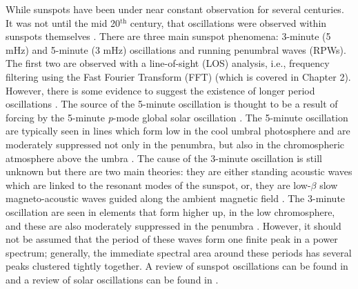     While sunspots have been under near constant observation for several centuries.
    It was not until the mid 20$^{\mathrm{th}}$ century, that oscillations were observed within sunspots themselves \citep{OASO}.
    There are three main sunspot phenomena: 3-minute (5 mHz) and 5-minute (3 mHz) oscillations and running penumbral waves (RPWs).
    The first two are observed with a line-of-sight (LOS) analysis, i.e., frequency filtering using the Fast Fourier Transform (FFT) (which is covered in Chapter 2).
    However, there is some evidence to suggest the existence of longer period oscillations \citep{LPO,SOS,Chorley2011}.
    The source of the 5-minute oscillation is thought to be a result of forcing by the 5-minute \textit{p}-mode global solar oscillation \citep{OWS,WAUO}.
    The 5-minute oscillation are typically seen in lines which form low in the cool umbral photosphere and are moderately suppressed not only in the penumbra, but also in the chromospheric atmosphere above the umbra \citep{OASO}.
    The cause of the 3-minute oscillation is still unknown but there are two main theories: they are either standing acoustic waves which are linked to the resonant modes of the sunspot, or, they are low-$\beta$ slow magneto-acoustic waves guided along the ambient magnetic field \citep{UTMO,OWS,OASO,ORWS}.
    The 3-minute oscillation are seen in elements that form higher up, in the low chromosphere, and these are also moderately suppressed in the penumbra \citep{OASO}.
    However, it should not be assumed that the period of these waves form one finite peak in a power spectrum; generally, the immediate spectral area around these periods has several peaks clustered tightly together.
    A review of sunspot oscillations can be found in \cite{OASO} and a review of solar oscillations can be found in \cite{SO}.
    
